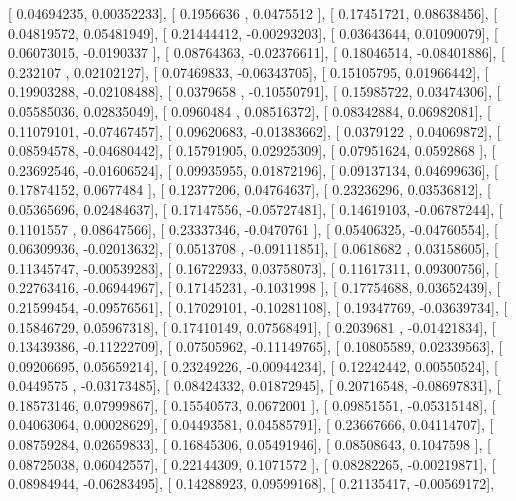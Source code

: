 \documentclass{article}
\begin{document}
       [ 0.04694235,  0.00352233],
       [ 0.1956636 ,  0.0475512 ],
       [ 0.17451721,  0.08638456],
       [ 0.04819572,  0.05481949],
       [ 0.21444412, -0.00293203],
       [ 0.03643644,  0.01090079],
       [ 0.06073015, -0.0190337 ],
       [ 0.08764363, -0.02376611],
       [ 0.18046514, -0.08401886],
       [ 0.232107  ,  0.02102127],
       [ 0.07469833, -0.06343705],
       [ 0.15105795,  0.01966442],
       [ 0.19903288, -0.02108488],
       [ 0.0379658 , -0.10550791],
       [ 0.15985722,  0.03474306],
       [ 0.05585036,  0.02835049],
       [ 0.0960484 ,  0.08516372],
       [ 0.08342884,  0.06982081],
       [ 0.11079101, -0.07467457],
       [ 0.09620683, -0.01383662],
       [ 0.0379122 ,  0.04069872],
       [ 0.08594578, -0.04680442],
       [ 0.15791905,  0.02925309],
       [ 0.07951624,  0.0592868 ],
       [ 0.23692546, -0.01606524],
       [ 0.09935955,  0.01872196],
       [ 0.09137134,  0.04699636],
       [ 0.17874152,  0.0677484 ],
       [ 0.12377206,  0.04764637],
       [ 0.23236296,  0.03536812],
       [ 0.05365696,  0.02484637],
       [ 0.17147556, -0.05727481],
       [ 0.14619103, -0.06787244],
       [ 0.1101557 ,  0.08647566],
       [ 0.23337346, -0.0470761 ],
       [ 0.05406325, -0.04760554],
       [ 0.06309936, -0.02013632],
       [ 0.0513708 , -0.09111851],
       [ 0.0618682 ,  0.03158605],
       [ 0.11345747, -0.00539283],
       [ 0.16722933,  0.03758073],
       [ 0.11617311,  0.09300756],
       [ 0.22763416, -0.06944967],
       [ 0.17145231, -0.1031998 ],
       [ 0.17754688,  0.03652439],
       [ 0.21599454, -0.09576561],
       [ 0.17029101, -0.10281108],
       [ 0.19347769, -0.03639734],
       [ 0.15846729,  0.05967318],
       [ 0.17410149,  0.07568491],
       [ 0.2039681 , -0.01421834],
       [ 0.13439386, -0.11222709],
       [ 0.07505962, -0.11149765],
       [ 0.10805589,  0.02339563],
       [ 0.09206695,  0.05659214],
       [ 0.23249226, -0.00944234],
       [ 0.12242442,  0.00550524],
       [ 0.0449575 , -0.03173485],
       [ 0.08424332,  0.01872945],
       [ 0.20716548, -0.08697831],
       [ 0.18573146,  0.07999867],
       [ 0.15540573,  0.0672001 ],
       [ 0.09851551, -0.05315148],
       [ 0.04063064,  0.00028629],
       [ 0.04493581,  0.04585791],
       [ 0.23667666,  0.04114707],
       [ 0.08759284,  0.02659833],
       [ 0.16845306,  0.05491946],
       [ 0.08508643,  0.1047598 ],
       [ 0.08725038,  0.06042557],
       [ 0.22144309,  0.1071572 ],
       [ 0.08282265, -0.00219871],
       [ 0.08984944, -0.06283495],
       [ 0.14288923,  0.09599168],
       [ 0.21135417, -0.00569172],
\end{document}
